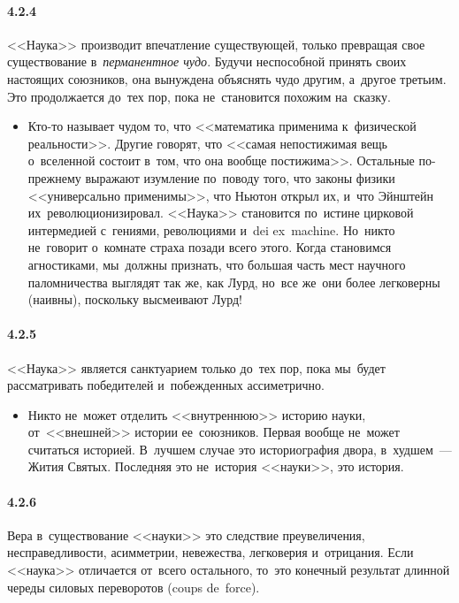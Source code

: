 \paragraph{4.2.4}\hypertarget{par:4.2.4}{} <<Наука>> производит впечатление существующей, только превращая свое существование в~{\itshape перманентное чудо}. Будучи неспособной принять своих настоящих союзников, она вынуждена объяснять чудо другим, а~другое третьим. Это продолжается до~тех пор, пока не~становится похожим на~сказку. 
	\begin{itemize}
	\item 
	Кто-то называет чудом то, что <<математика применима к~физической реальности>>. Другие говорят, что <<самая непостижимая вещь о~вселенной состоит в~том, что она вообще постижима>>. Остальные по-прежнему выражают изумление по~поводу того, что законы физики <<универсально применимы>>, что Ньютон открыл их, и~что Эйнштейн их~революционизировал. <<Наука>> становится по~истине цирковой интермедией с~гениями, революциями и~dei ex~machine. Но~никто не~говорит о~комнате страха позади всего этого. Когда становимся агностиками, мы~должны признать, что большая часть мест научного паломничества выглядят так же, как Лурд, но~все же~они более легковерны (наивны), поскольку высмеивают Лурд!
	\end{itemize}	

\paragraph{4.2.5}\hypertarget{par:4.2.5}{} <<Наука>> является санктуарием только до~тех пор, пока мы~будет рассматривать победителей и~побежденных ассиметрично. 
	\begin{itemize}
	\item 
	Никто не~может отделить <<внутреннюю>> историю науки, от~<<внешней>> истории ее~союзников. Первая вообще не~может считаться историей. В~лучшем случае это историография двора, в~худшем~--- Жития Святых. Последняя это не~история <<науки>>, это история.
	\end{itemize}


\paragraph{4.2.6}\hypertarget{par:4.2.6}{} Вера в~существование <<науки>> это следствие преувеличения, несправедливости, асимметрии, невежества, легковерия и~отрицания. Если <<наука>> отличается от~всего остального, то~это конечный результат длинной череды силовых переворотов (coups de~force).


